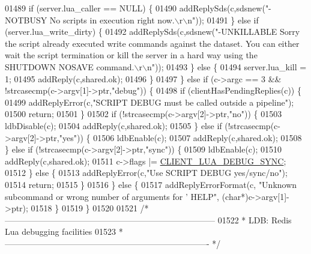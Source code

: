 \begin{DoxyCode}
{{{{{{{{{{{{01489         \textcolor{keywordflow}{if} (server.lua\_caller == NULL) \{
01490             addReplySds(c,sdsnew(\textcolor{stringliteral}{"-NOTBUSY No scripts in execution right now.\(\backslash\)r\(\backslash\)n"}));
01491         \} \textcolor{keywordflow}{else} \textcolor{keywordflow}{if} (server.lua\_write\_dirty) \{
01492             addReplySds(c,sdsnew(\textcolor{stringliteral}{"-UNKILLABLE Sorry the script already executed write commands against
       the dataset. You can either wait the script termination or kill the server in a hard way using the SHUTDOWN
       NOSAVE command.\(\backslash\)r\(\backslash\)n"}));
01493         \} \textcolor{keywordflow}{else} \{
01494             server.lua\_kill = 1;
01495             addReply(c,shared.ok);
01496         \}
01497     \} \textcolor{keywordflow}{else} \textcolor{keywordflow}{if} (c->argc == 3 && !strcasecmp(c->argv[1]->ptr,\textcolor{stringliteral}{"debug"})) \{
01498         \textcolor{keywordflow}{if} (clientHasPendingReplies(c)) \{
01499             addReplyError(c,\textcolor{stringliteral}{"SCRIPT DEBUG must be called outside a pipeline"});
01500             \textcolor{keywordflow}{return};
01501         \}
01502         \textcolor{keywordflow}{if} (!strcasecmp(c->argv[2]->ptr,\textcolor{stringliteral}{"no"})) \{
01503             ldbDisable(c);
01504             addReply(c,shared.ok);
01505         \} \textcolor{keywordflow}{else} \textcolor{keywordflow}{if} (!strcasecmp(c->argv[2]->ptr,\textcolor{stringliteral}{"yes"})) \{
01506             ldbEnable(c);
01507             addReply(c,shared.ok);
01508         \} \textcolor{keywordflow}{else} \textcolor{keywordflow}{if} (!strcasecmp(c->argv[2]->ptr,\textcolor{stringliteral}{"sync"})) \{
01509             ldbEnable(c);
01510             addReply(c,shared.ok);
01511             c->flags |= \hyperlink{server_8h_a2f388b8fa8e4b592be374850524472e5}{CLIENT\_LUA\_DEBUG\_SYNC};
01512         \} \textcolor{keywordflow}{else} \{
01513             addReplyError(c,\textcolor{stringliteral}{"Use SCRIPT DEBUG yes/sync/no"});
01514             \textcolor{keywordflow}{return};
01515         \}
01516     \} \textcolor{keywordflow}{else} \{
01517         addReplyErrorFormat(c, \textcolor{stringliteral}{"Unknown subcommand or wrong number of arguments for '%
       HELP"}, (\textcolor{keywordtype}{char}*)c->argv[1]->ptr);
01518     \}
01519 \}
01520 
01521 \textcolor{comment}{/* ---------------------------------------------------------------------------}
01522 \textcolor{comment}{ * LDB: Redis Lua debugging facilities}
01523 \textcolor{comment}{ * ------------------------------------------------------------------------- */}
}}}}}}}}}}}}
\end{DoxyCode}
